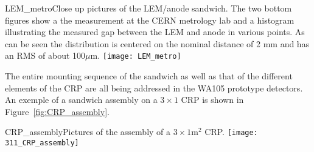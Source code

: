 \begin{cdrfigure}{LEM_metro}{Close up pictures of the LEM/anode sandwich. The two
       bottom figures show a the measurement at the CERN metrology lab
       and a histogram illustrating the measured gap between the LEM
       and anode in various points. As can be seen the distribution is
       centered on the nominal distance of 2 mm and has an RMS of
       about 100$\mu$m.}
     \texttt{[image: LEM\_metro]}
\end{cdrfigure}

The entire mounting sequence of the sandwich as well as that of the different elements of the CRP are all being addressed in the  WA105 prototype detectors. An exemple of a sandwich assembly on a   $3\times1$ CRP is shown in Figure~\ref{fig:CRP_assembly}.

\begin{cdrfigure}{CRP_assembly}{Pictures of the assembly of a $3\times1$m$^2$ CRP.}
     \texttt{[image: 311\_CRP\_assembly]}  
\end{cdrfigure}